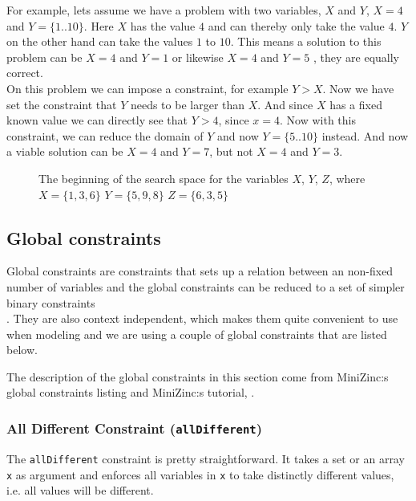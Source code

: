 For example, lets assume we have a problem with two variables, $X$ and $Y$, $X = 4$ and $Y = \{1..10\}$. Here $X$ has the value $4$ and can thereby only take the value $4$. $Y$ on the other hand can take the values $1$ to $10$. This means a solution to this problem can be $X = 4$ and $Y = 1$ or likewise $X = 4$ and $Y = 5$ , they are equally correct.\\
On this problem we can impose a constraint, for example $Y > X$. Now we have set the constraint that $Y$ needs to be larger than $X$. And since $X$ has a fixed known value we can directly see that $Y > 4$, since $x = 4$. Now with this constraint, we can reduce the domain of $Y$ and now $Y = \{5..10\}$ instead. And now a viable solution can be $X = 4$ and $Y = 7$, but not $X = 4$ and $Y = 3$.

\begin{figure}
  \caption{The beginning of the search space for the variables $X$, $Y$, $Z$, where $X=\{1,3,6\}$ $Y=\{5,9,8\}$ $Z=\{6,3,5\}$}
  \label{fig:search_space}
\end{figure}

\subsection{Global constraints}
Global constraints are constraints that sets up a relation between an non-fixed number of variables and the global constraints can be reduced to a set of simpler binary constraints\\\cite{global_const}. They are also context independent\cite{global_constraint_catalogue}, which makes them quite convenient to use when modeling and we are using a couple of global constraints that are listed below.

The description of the global constraints in this section come from MiniZinc:s global constraints listing \cite{mz_global_constraints} and MiniZinc:s tutorial, \cite{mz_tute}.

\subsubsection{All Different Constraint (\texttt{allDifferent})}
The \texttt{allDifferent} constraint is pretty straightforward. It takes a set or an array \texttt{x} as argument and enforces all variables in \texttt{x} to take distinctly different values, i.e. all values will be different.


